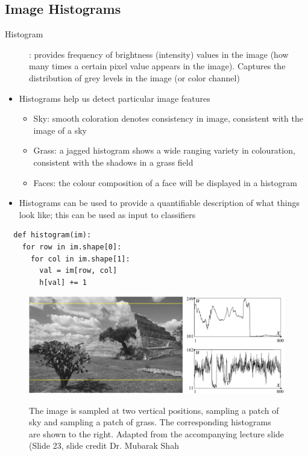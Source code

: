 \documentclass[letterpaper,12pt]{article}
\begin{document}
\subsection{Image Histograms}
\begin{description}
 \item[Histogram]: provides frequency of brightness (intensity) values in the image (how many times a certain pixel value appears in the image). Captures the distribution of grey levels in the image (or color channel)
\end{description}
\begin{itemize}
 \item Histograms help us detect particular image features
       \begin{itemize}
        \item Sky: smooth coloration denotes consistency in image, consistent with the image of a sky
        \item Grass: a jagged histogram shows a wide ranging variety in colouration, consistent with the shadows in a grass field
        \item Faces: the colour composition of a face will be displayed in a histogram
       \end{itemize}
 \item Histograms can be used to provide a quantifiable description of what things look like; this can be used as input to classifiers
\end{itemize}

\begin{lstlisting}
  def histogram(im):
    for row in im.shape[0]:
      for col in im.shape[1]:
        val = im[row, col]
        h[val] += 1
\end{lstlisting}

\begin{figure}[H]
 \begin{center}
  \includegraphics[scale=0.4]{images/histogram.png} \\
  \caption{The image is sampled at two vertical positions, sampling a patch of sky and sampling a patch of grass. The corresponding histograms are shown to the right. Adapted from the accompanying lecture slide (Slide 23, slide credit Dr. Mubarak Shah}
 \end{center}
\end{figure}
\end{document}
